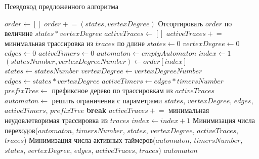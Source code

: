 \documentclass[times,specification,annotation]{itmo-student-thesis}
\begin{document}
\begin{algorithm}[!ht]
\caption{Псевдокод предложенного алгоритма}\label{lst1}
\begin{algorithmic}[1]
		\State $order \gets []$
		 \label{lst:line:start1}
				\State $order \mathrel{+}= \left(states, vertexDegree\right)$
			\EndFor
		\EndFor	\label{lst:line:end1}
		\State Отсортировать $order$ по величине $states * vertexDegree$
		\State $activeTraces \gets []$ \label{lst:line:activeTraces}
		\State $activeTraces \mathrel{+}=$ минимальная трассировка из $traces$ по длине
		\State $states \gets 0$
		\State $vertexDegree \gets 0$
		\State $edges \gets 0$
		\State $activeTimers \gets 0$
		\State $automaton \gets emptyAutomaton$
		\State $index \gets 1$
		\Loop \label{lst:line:start2} 
			\State $\left(statesNumber, vertexDegreeNumber\right) \gets order[index]$
			\State $states \gets statesNumber$
			\State $vertexDegree \gets vertexDegreeNumber$
			\State $edges \gets states * vertexDegree$
			\State $activeTimers \gets edges * timersNumber$
			\State $prefixTree \gets$ префиксное дерево по трассировкам из $activeTraces$
			\State $automaton \gets$ решить ограничения с параметрами $states$, $vertexDegree$, $edges$, $activeTimers$, $prefixTree$
					\State \textbf{break}
				\Else
					\State $activeTraces \mathrel{+}=$ минимальная неудовлетворимая трассировка из $traces$
				\EndIf
			\Else
				\State $index \gets index + 1$
			\EndIf
		\EndLoop \label{lst:line:end2}
		\State Минимизация числа переходов($automaton$, $timersNumber$, $states$, $vertexDegree$, $activeTraces$, $traces$)
		\State Минимизация числа активных таймеров($automaton$, $timersNumber$, $states$, $vertexDegree$, $edges$, $activeTraces$, $traces$)
		\State\Return $automaton$
	\EndFunction
\end{algorithmic}
\end{algorithm}
\end{document}
